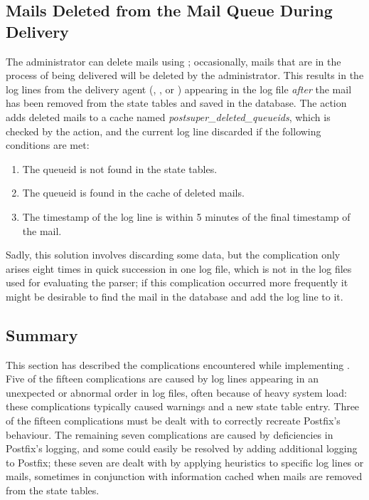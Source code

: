 \subsection{Mails Deleted from the Mail Queue During Delivery}

\label{Mails deleted during delivery}

The administrator can delete mails using ; occasionally,
mails that are in the process of being delivered will be deleted by the
administrator.  This results in the log lines from the delivery agent
(, , or ) appearing in the log
file \textit{after\/} the mail has been removed from the state tables and
saved in the database.  The  action adds deleted mails to a
cache named \textit{postsuper\_deleted\_queueids}, which is checked by the
 action, and the current log line discarded if the
following conditions are met:

\begin{enumerate}

    \item The queueid is not found in the state tables.

    \item The queueid is found in the cache of deleted mails.

    \item The timestamp of the log line is within 5 minutes of the final
        timestamp of the mail.

\end{enumerate}

Sadly, this solution involves discarding some data, but the complication
only arises eight times in quick succession in one log file, which is not
in the \numberOFlogFILES{} log files used for evaluating the parser; if
this complication occurred more frequently it might be desirable to find
the mail in the database and add the log line to it.

\subsection{Summary}

This section has described the complications encountered while implementing
\parsername{}.  Five of the fifteen complications are caused by log lines
appearing in an unexpected or abnormal order in log files, often because of
heavy system load: these complications typically caused warnings and a new
state table entry.  Three of the fifteen complications must be dealt with
to correctly recreate Postfix's behaviour.  The remaining seven
complications are caused by deficiencies in Postfix's logging, and some
could easily be resolved by adding additional logging to Postfix; these
seven are dealt with by applying heuristics to specific log lines or mails,
sometimes in conjunction with information cached when mails are removed
from the state tables.
